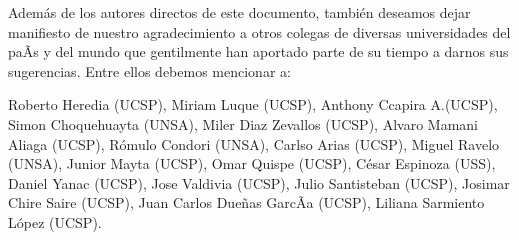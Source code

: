 Además de los autores directos de este documento, también deseamos dejar manifiesto de nuestro 
agradecimiento a otros colegas de diversas universidades del paÃ­s y del mundo que gentilmente 
han aportado parte de su tiempo a darnos sus sugerencias. Entre ellos debemos mencionar a: 

Roberto Heredia (UCSP), 
Miriam Luque (UCSP), 
Anthony Ccapira A.(UCSP), 
Simon Choquehuayta (UNSA), 
Miler Diaz Zevallos (UCSP), 
Alvaro Mamani Aliaga (UCSP), 
Rómulo Condori (UNSA), 
Carlso Arias (UCSP), 
Miguel Ravelo (UNSA), 
Junior Mayta (UCSP), 
Omar Quispe (UCSP), 
César Espinoza (USS), 
Daniel Yanac (UCSP), 
Jose Valdivia (UCSP), 
Julio Santisteban (UCSP), 
Josimar Chire Saire (UCSP), 
Juan Carlos Dueñas GarcÃ­a (UCSP), 
Liliana Sarmiento López (UCSP).